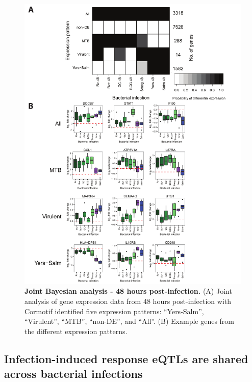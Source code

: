 \begin{figure}
\centering
\includegraphics[width=5in]{img/ch02/fig-04-joint-48h.pdf}
\caption[Joint Bayesian analysis - 48 hours
  post-infection.]{\textbf{Joint Bayesian analysis - 48 hours
    post-infection.} (A) Joint analysis of gene expression data from
  48 hours post-infection with Cormotif identified five expression
  patterns: ``Yers-Salm'', ``Virulent'', ``MTB'', ``non-DE'', and
  ``All''. (B) Example genes from the different expression patterns.}
\label{fig:joint-48h}
\end{figure}

\subsection{Infection-induced response eQTLs are shared across
bacterial
infections}\label{infection-induced-response-eqtls-are-shared-across-bacterial-infections}

